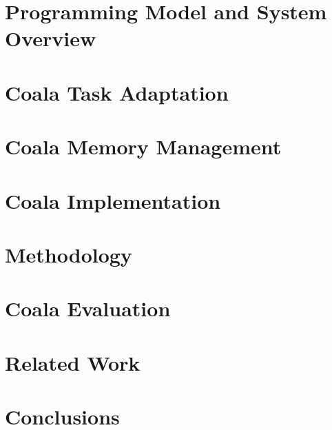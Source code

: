 \documentclass[pageno]{jpaper}
\newcommand{\sys}{Coala\xspace}
\begin{document}
\section{Programming Model and System Overview}
\label{sec:systemdescription}
%

%
\section{\sys Task Adaptation}
\label{sec:task_adaptation}
%

%

%
\section{\sys Memory Management}
\label{sec:memory_virtulaization}
%

%
\section{\sys Implementation}
\label{sec:implementation}
%

%
%
%
\section{Methodology}
\label{sec:methodology}
%

%
\section{\sys Evaluation}
\label{sec:evaluation}
%

%
\section{Related Work}
\label{sec:related_work}
%

%
\section{Conclusions}
\label{sec:conclusions}
%

%


%
\end{document}
